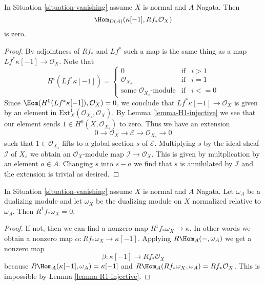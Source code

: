 \begin{lemma}
\label{lemma-R1-injective}
In Situation \ref{situation-vanishing} assume $X$ is normal and $A$ Nagata.
Then
$$
\Hom_{D(A)}(\kappa[-1], Rf_*\mathcal{O}_X)
$$
is zero.
\end{lemma}

\begin{proof}
By adjointness of $Rf_*$ and $Lf^*$ such a map is the same thing
as a map $Lf^*\kappa[-1] \to \mathcal{O}_X$. Note that
$$
H^i(Lf^*\kappa[-1]) =
\left\{
\begin{matrix}
0 & \text{if} & i > 1 \\
\mathcal{O}_{X_s} & \text{if} & i = 1 \\
\text{some }\mathcal{O}_{X_s}\text{-module} & \text{if} & i <= 0
\end{matrix}
\right.
$$
Since $\Hom(H^0(Lf^*\kappa[-1]), \mathcal{O}_X) = 0$, we conclude that
$Lf^*\kappa[-1] \to \mathcal{O}_X$ is given by an element in
$\text{Ext}^1_X(\mathcal{O}_{X_s}, \mathcal{O}_X)$. By Lemma
\ref{lemma-H1-injective} we see that our element sends
$1 \in H^0(X, \mathcal{O}_{X_s})$ to zero. Thus we have an extension
$$
0 \to \mathcal{O}_X \to \mathcal{E} \to \mathcal{O}_{X_s} \to 0
$$
such that $1 \in \mathcal{O}_{X_s}$ lifts to a global section $s$ of
$\mathcal{E}$. Multiplying $s$ by the ideal sheaf $\mathcal{I}$
of $X_s$ we obtain an $\mathcal{O}_X$-module map
$\mathcal{I} \to \mathcal{O}_X$. This is given by multplication
by an element $a \in A$. Changing $s$ into $s -  a$ we find that
$s$ is annihilated by $\mathcal{I}$ and the extension is trivial
as desired.
\end{proof}


\begin{proposition}
\label{proposition-Grauert-Riemenschneider}
In Situation \ref{situation-vanishing} assume $X$ is normal and $A$ Nagata.
Let $\omega_A$ be a dualizing module and let $\omega_X$ be the dualizing
module on $X$ normalized relative to $\omega_A$.
Then $R^1f_*\omega_X = 0$.
\end{proposition}

\begin{proof}
If not, then we can find a nonzero map $R^1f_*\omega_X \to \kappa$.
In other words we obtain a nonzero map $\alpha : Rf_*\omega_X \to \kappa[-1]$.
Applying $R\Hom_A(-, \omega_A)$
we get a nonzero map
$$
\beta : \kappa[-1] \longrightarrow Rf_*\mathcal{O}_X
$$
because $R\Hom_A(\kappa[-1], \omega_A) = \kappa[-1]$
and $R\Hom_A(Rf_*\omega_X, \omega_A) = Rf_*\mathcal{O}_X$.
This is impossible by Lemma \ref{lemma-R1-injective}.
\end{proof}






